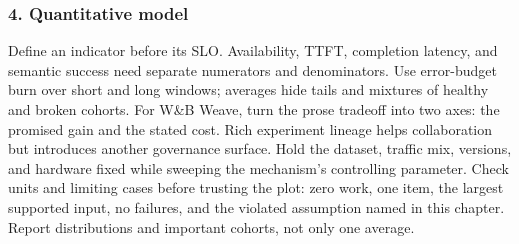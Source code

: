\subsubsection*{4. Quantitative model}
Define an indicator before its SLO. Availability, TTFT, completion latency, and semantic success need separate numerators and denominators. Use error-budget burn over short and long windows; averages hide tails and mixtures of healthy and broken cohorts.
For W\&B Weave, turn the prose tradeoff into two axes: the promised gain and the stated cost. Rich experiment lineage helps collaboration but introduces another governance surface. Hold the dataset, traffic mix, versions, and hardware fixed while sweeping the mechanism's controlling parameter.
Check units and limiting cases before trusting the plot: zero work, one item, the largest supported input, no failures, and the violated assumption named in this chapter. Report distributions and important cohorts, not only one average.
